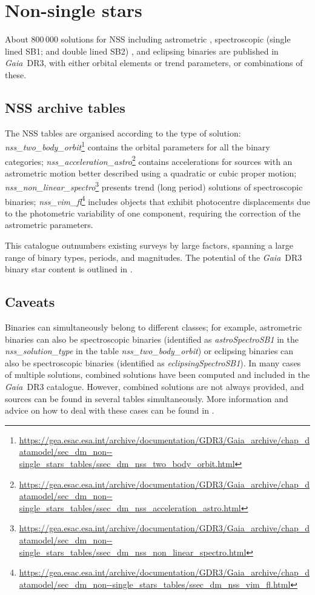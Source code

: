 \documentclass[longauth]{aa}
\makeatletter
\providecommand\gdrthree{\textit{Gaia}~DR3\xspace}
\providecommand{\linktodoc}{https://gea.esac.esa.int/archive/documentation/GDR3}
\providecommand{\nsstable}[1]{\url{\linktodoc/Gaia_archive/chap_datamodel/sec_dm_non--single_stars_tables/ssec_dm_#1.html}} %
\DeclareRobustCommand*{\fieldName}[1]{%
  \begingroup\@fieldName\scantokens{\texttt{\small {#1}}\noexpand}\endgroup}
\makeatother
\begin{document}
\section{Non-single stars}\label{ssec:binary}

About 800\,000 solutions for NSS including astrometric \citep{DR3-DPACP-163}, spectroscopic  (single lined  SB1; and double lined  SB2) \citep{DR3-DPACP-178}, and eclipsing binaries \citep{DR3-DPACP-179}  are published in \gdrthree, with either orbital elements or trend parameters, or combinations of these.  
\subsection{NSS archive tables}\label{ssec:nssTables}
The NSS tables are organised according to the type of solution: \textit{nss\_two\_body\_orbit}\footnote{\nsstable{nss_two_body_orbit}} contains the orbital parameters for all the binary categories;  \textit{nss\_acceleration\_astro}\footnote{\nsstable{nss_acceleration_astro}} contains accelerations  for sources with an astrometric motion better described using a quadratic or cubic proper motion;  \textit{nss\_non\_linear\_spectro}\footnote{\nsstable{nss_non_linear_spectro}} presents trend (long period) solutions of spectroscopic binaries; \textit{nss\_vim\_fl}\footnote{\nsstable{nss_vim_fl}} includes objects that exhibit photocentre displacements due to the photometric variability of one component, requiring the correction of the astrometric parameters.

This catalogue outnumbers existing surveys by large factors, spanning a large range of binary types, periods, and magnitudes. The potential of the \gdrthree binary star content is outlined in \citet{DR3-DPACP-100}.






\subsection{Caveats}

Binaries can simultaneously belong to different classes; for example, astrometric  binaries can also be  spectroscopic binaries (identified as \textit{astroSpectroSB1}
in the \textit{nss\_solution\_type} in the table \textit{nss\_two\_body\_orbit}) %
or eclipsing binaries can also be spectroscopic binaries (identified as \textit{eclipsingSpectroSB1}).
In many cases of multiple solutions, combined solutions have been computed and included in the \gdrthree catalogue.  
However, combined solutions are not always provided, and  sources can be found  in several tables simultaneously. More information and advice on how to deal with these cases  can be found in \cite{DR3-DPACP-100}.
\end{document}
